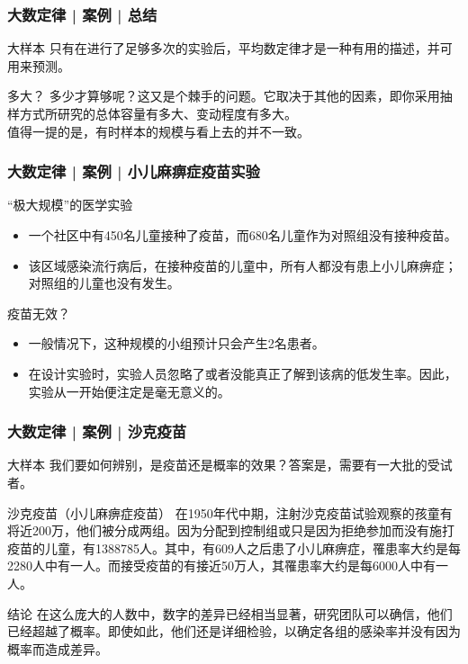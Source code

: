 \begin{frame}
  \frametitle{大数定律 | 案例 | 总结}
  \begin{block}{大样本}
    只有在进行了足够多次的实验后，平均数定律才是一种有用的描述，并可用来预测。
  \end{block}
  \pause
  \begin{block}{多大？}
    多少才算够呢？这又是个棘手的问题。它取决于其他的因素，即你采用抽样方式所研究的总体容量有多大、变动程度有多大。\\
    \vspace{0.5em}
    值得一提的是，有时样本的规模与看上去的并不一致。
  \end{block}
\end{frame}

\begin{frame}
  \frametitle{大数定律 | 案例 | 小儿麻痹症疫苗实验}
  \begin{block}{“极大规模”的医学实验}
    \begin{itemize}
      \item 一个社区中有450名儿童接种了疫苗，而680名儿童作为对照组没有接种疫苗。
      \item 该区域感染流行病后，在接种疫苗的儿童中，所有人都没有患上小儿麻痹症；对照组的儿童也没有发生。
    \end{itemize}
  \end{block}
  \pause
  \begin{block}{疫苗无效？}
    \begin{itemize}
      \item 一般情况下，这种规模的小组预计只会产生2名患者。
      \item 在设计实验时，实验人员忽略了或者没能真正了解到该病的低发生率。因此，实验从一开始便注定是毫无意义的。
    \end{itemize}
  \end{block}
\end{frame}

\begin{frame}
  \frametitle{大数定律 | 案例 | 沙克疫苗}
  \begin{block}{大样本}
    我们要如何辨别，是疫苗还是概率的效果？答案是，需要有一大批的受试者。
  \end{block}
  \pause
  \begin{block}{沙克疫苗（小儿麻痹症疫苗）}
    在1950年代中期，注射沙克疫苗试验观察的孩童有将近200万，他们被分成两组。因为分配到控制组或只是因为拒绝参加而没有施打疫苗的儿童，有1388785人。其中，有609人之后患了小儿麻痹症，罹患率大约是每2280人中有一人。而接受疫苗的有接近50万人，其罹患率大约是每6000人中有一人。
  \end{block}
  \pause
  \begin{block}{结论}
    在这么庞大的人数中，数字的差异已经相当显著，研究团队可以确信，他们已经超越了概率。即使如此，他们还是详细检验，以确定各组的感染率并没有因为概率而造成差异。
  \end{block}
\end{frame}


